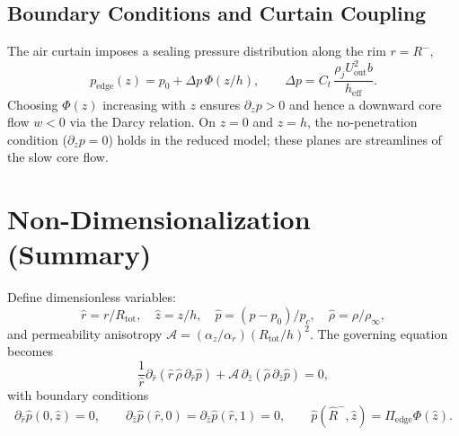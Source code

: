 \documentclass[11pt,a4paper]{article}
\begin{document}
\subsection{Boundary Conditions and Curtain Coupling}
The air curtain imposes a sealing pressure distribution along the rim $r=R^{-}$,
\begin{equation}
  p_{\mathrm{edge}}(z)=p_0+\Delta p\,\Phi(z/h),\qquad
  \Delta p=C_t\,\frac{\rho_j U_{\mathrm{out}}^2 b}{h_{\mathrm{eff}}}.
\end{equation}
Choosing $\Phi(z)$ increasing with $z$ ensures $\partial_z p>0$ and hence a downward core flow $w<0$ via the Darcy relation. 
On $z=0$ and $z=h$, the no-penetration condition ($\partial_z p=0$) holds in the reduced model; these planes are streamlines of the slow core flow.

\section{Non-Dimensionalization (Summary)}
Define dimensionless variables:
\begin{equation}
  \hat r=r/R_{\mathrm{tot}},\quad \hat z=z/h,\quad 
  \hat p=(p-p_0)/p_c,\quad \hat\rho=\rho/\rho_\infty,
\end{equation}
and permeability anisotropy $\mathcal{A}=(\alpha_z/\alpha_r)(R_{\mathrm{tot}}/h)^2$.
The governing equation becomes
\begin{equation}
  \frac{1}{\hat r}\partial_{\hat r}\!\left(\hat r\,\hat\rho\,\partial_{\hat r}\hat p\right)
  +\mathcal{A}\,\partial_{\hat z}\!\left(\hat\rho\,\partial_{\hat z}\hat p\right)=0,
\end{equation}
with boundary conditions
\begin{equation}
  \partial_{\hat r}\hat p(0,\hat z)=0,\qquad
  \partial_{\hat z}\hat p(\hat r,0)=\partial_{\hat z}\hat p(\hat r,1)=0,\qquad
  \hat p(\hat R^{-},\hat z)=\Pi_{\mathrm{edge}}\Phi(\hat z).
\end{equation}
\end{document}
